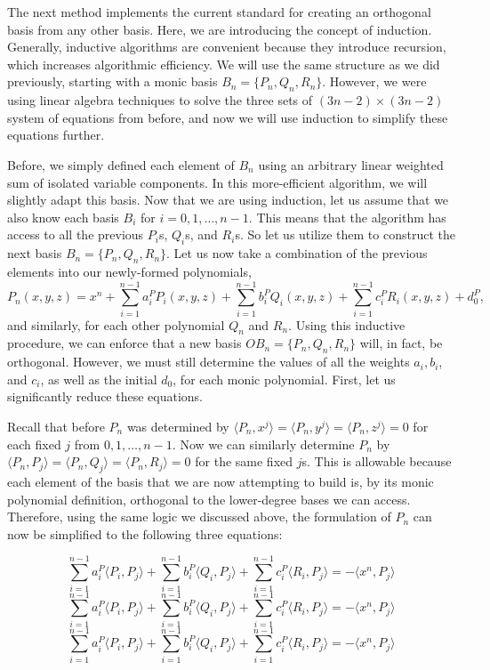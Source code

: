 \documentclass[letterpaper, 12pt]{article}
\begin{document}
The next method implements the current standard for creating an orthogonal basis from any other basis. Here, we are introducing the concept of induction. Generally, inductive algorithms are convenient because they introduce recursion, which increases algorithmic efficiency. We will use the same structure as we did previously, starting with a monic basis $B_n = \{P_n, Q_n, R_n\}$. However, we were using linear algebra techniques to solve the three sets of $(3n-2)\times(3n-2)$ system of equations from before, and now we will use induction to simplify these equations further.

Before, we simply defined each element of $B_n$ using an arbitrary linear weighted sum of isolated variable components. In this more-efficient algorithm, we will slightly adapt this basis. Now that we are using induction, let us assume that we also know each basis $B_i$ for $i = 0, 1, \ldots, n-1$. This means that the algorithm has access to all the previous $P_i$s, $Q_i$s, and $R_i$s. So let us utilize them to construct the next basis $B_n =  \{P_n, Q_n, R_n\}$. Let us now take a combination of the previous elements into our newly-formed polynomials,
$$P_n(x, y, z) = x^n + \sum_{i=1}^{n-1} a_i^PP_i(x,y,z) + \sum_{i=1}^{n-1} b_i^PQ_i(x,y,z) + \sum_{i=1}^{n-1} c_i^PR_i(x,y,z) +d_0^P,$$ and similarly, for each other polynomial $Q_n$ and $R_n$. Using this inductive procedure, we can enforce that a new basis $OB_n = \{P_n, Q_n, R_n\}$ will, in fact, be orthogonal. However, we must still determine the values of all the weights $a_i, b_i$, and $c_i$, as well as the initial $d_0$, for each monic polynomial. First, let us significantly reduce these equations.

Recall that before $P_n$ was determined by $\langle P_n, x^j\rangle = \langle P_n, y^j\rangle = \langle P_n, z^j\rangle = 0$ for each fixed $j$ from  $0,1, \ldots, n-1$. Now we can similarly determine $P_n$ by $\langle P_n, P_j\rangle = \langle P_n, Q_j\rangle = \langle P_n, R_j\rangle = 0$ for the same fixed $j$s. This is allowable because each element of the basis that we are now attempting to build is, by its monic polynomial definition, orthogonal to the lower-degree bases we can access. Therefore, using the same logic we discussed above, the formulation of $P_n$ can now be simplified to the following three equations:

\newpage
\vspace*{-12mm}
$$\sum_{i=1}^{n-1} a_i^P\langle P_i, P_j \rangle + \sum_{i=1}^{n-1} b_i^P\langle Q_i, P_j \rangle + \sum_{i=1}^{n-1} c_i^P\langle R_i, P_j \rangle = -\langle x^n, P_j\rangle$$ 
$$\sum_{i=1}^{n-1} a_i^P\langle P_i, P_j \rangle + \sum_{i=1}^{n-1} b_i^P\langle Q_i, P_j \rangle + \sum_{i=1}^{n-1} c_i^P\langle R_i, P_j \rangle = -\langle x^n, P_j\rangle$$ 
$$\sum_{i=1}^{n-1} a_i^P\langle P_i, P_j \rangle + \sum_{i=1}^{n-1} b_i^P\langle Q_i, P_j \rangle + \sum_{i=1}^{n-1} c_i^P\langle R_i, P_j \rangle = -\langle x^n, P_j\rangle$$ 
\end{document}
